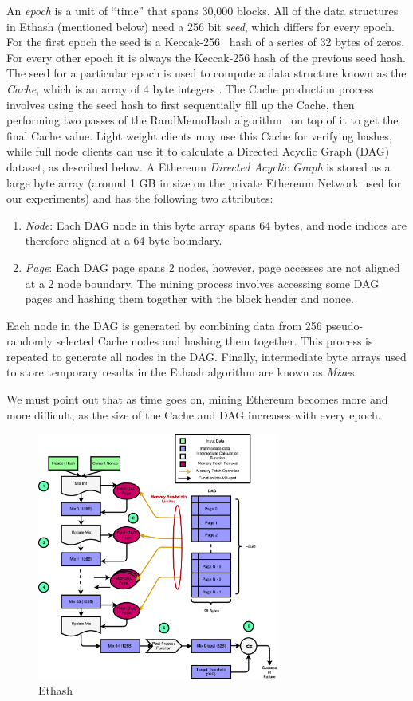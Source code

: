 \documentclass[runningheads]{llncs}
\begin{document}
An \emph{epoch} is a unit of ``time'' that spans 30,000 blocks.  All of the data structures in Ethash (mentioned below) need a 256 bit \emph{seed}, which differs for every epoch. For the first epoch the seed is a Keccak-256~\cite{keccak} hash of a series of 32 bytes of zeros. For every other epoch it is always the Keccak-256 hash of the previous seed hash.  The seed for a particular epoch is used to compute a data structure known as the \emph{Cache}, which is an array of 4 byte integers \cite{Ethmining}. The Cache production process involves using the seed hash to first sequentially fill up the Cache, then performing two passes of the RandMemoHash algorithm~\cite{randmemohash} on top of it to get the final Cache value. 
Light weight clients may use this Cache for verifying hashes, while full node clients can use it to calculate a Directed Acyclic Graph (DAG) dataset, as described below.  A Ethereum \emph{Directed Acyclic Graph} is stored as a large byte array (around 1 GB in size on the private Ethereum Network used for our experiments) and has the following two attributes:
  \begin{enumerate}
  \item \emph{Node}: Each DAG node in this byte array spans 64 bytes, and node indices are therefore aligned at a 64 byte boundary.
  \item \emph{Page}: Each DAG page spans 2 nodes, however, page accesses are not aligned at a 2 node boundary. The mining process involves accessing some DAG pages and hashing them together with the block header and nonce.
  \end{enumerate}
Each node in the DAG is generated by combining data from 256 pseudo-randomly selected Cache nodes and hashing them together. This process is repeated to generate all nodes in the DAG. Finally, intermediate byte arrays used to store temporary results in the Ethash algorithm are known as \emph{Mix}es.

We must point out that as time goes on, mining Ethereum becomes more and more difficult, as the size of the Cache and DAG increases with every epoch. 

\begin{figure}[h]
\centering
\includegraphics[width=300px,keepaspectratio]{Ethash.pdf}
\caption{Ethash}
\label{fig:ethash}
\end{figure}
\end{document}
